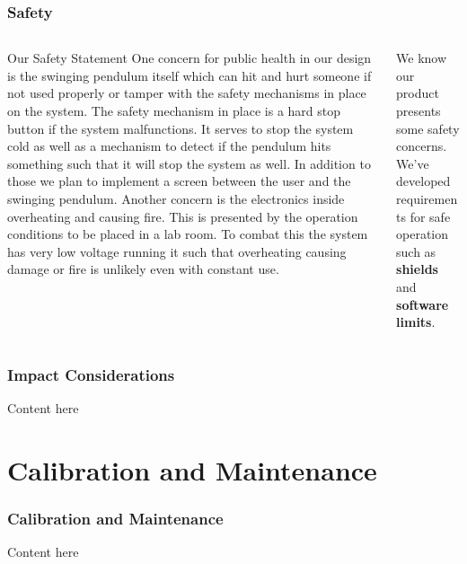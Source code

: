 \documentclass[aspectratio=169]{beamer}
\begin{document}
\begin{frame}
    \frametitle{Safety}

    \begin{columns}
        \begin{column}{0.75\textwidth}
            \begin{block}{Our Safety Statement}
                One concern for public health in our design is the swinging pendulum itself which can hit and hurt someone if not used properly or tamper with the safety mechanisms in place on the system. The safety mechanism in place is a hard stop button if the system malfunctions. It serves to stop the system cold as well as a mechanism to detect if the pendulum hits something such that it will stop the system as well. In addition to those we plan to implement a screen between the user and the swinging pendulum. Another concern is the electronics inside overheating and causing fire. This is presented by the operation conditions to be placed in a lab room. To combat this the system has very low voltage running it such that overheating causing damage or fire is unlikely even with constant use.
            \end{block}
        \end{column}

        \begin{column}{0.20\textwidth}
            We know our product presents some safety concerns. We've developed
            requirements for safe operation such as \textbf{shields} and
            \textbf{software limits}.
        \end{column}
    \end{columns}

\end{frame}


\begin{frame}
    \frametitle{Impact Considerations}

    Content here

\end{frame}

\section{Calibration and Maintenance}
\begin{frame}
    \frametitle{Calibration and Maintenance}

    Content here

\end{frame}
\end{document}
